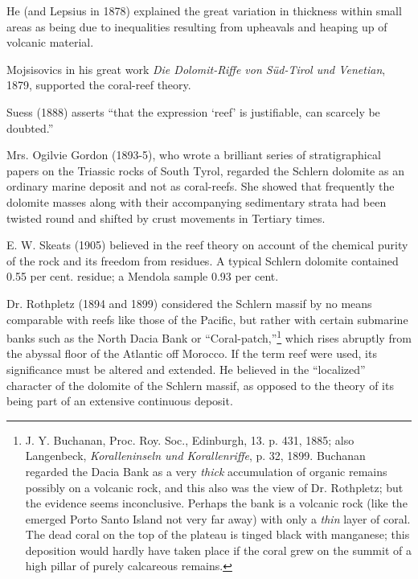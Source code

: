 \documentclass[a4paper, 12pt, oneside]{article}
\begin{document}
He (and Lepsius in 1878) explained the great variation in thickness within small areas as being due to inequalities resulting from upheavals and heaping up of volcanic material.

Mojsisovics in his great work \emph{Die Dolomit-Riffe von Süd-Tirol und Venetian}, 1879, supported the coral-reef theory.

Suess (1888) asserts ``that the expression `reef' is justifiable, can scarcely be doubted.''

Mrs. Ogilvie Gordon (1893-5), who wrote a brilliant series of stratigraphical papers on the Triassic rocks of South Tyrol, regarded the Schlern dolomite as an ordinary marine deposit and not as coral-reefs. She showed that frequently the dolomite masses along with their accompanying sedimentary strata had been twisted round and shifted by crust movements in Tertiary times.

E. W. Skeats (1905) believed in the reef theory on account of the chemical purity of the rock and its freedom from residues. A typical Schlern dolomite contained 0.55 per cent. residue; a Mendola sample 0.93 per cent.

Dr. Rothpletz (1894 and 1899) considered the Schlern massif by no means comparable with reefs like those of the Pacific, but rather with certain submarine banks such as the North Dacia Bank or ``Coral-patch,''\footnote{J. Y. Buchanan, Proc. Roy. Soc., Edinburgh, 13. p. 431, 1885; also Langenbeck, \emph{Koralleninseln und Korallenriffe}, p. 32, 1899. Buchanan regarded the Dacia Bank as a very \emph{thick} accumulation of organic remains possibly on a volcanic rock, and this also was the view of Dr. Rothpletz; but the evidence seems inconclusive. Perhaps the bank is a volcanic rock (like the emerged Porto Santo Island not very far away) with only a \emph{thin} layer of coral. The dead coral on the top of the plateau is tinged black with manganese; this deposition would hardly have taken place if the coral grew on the summit of a high pillar of purely calcareous remains.} which rises abruptly from the abyssal floor of the Atlantic off Morocco. If the term reef were used, its significance must be altered and extended. He believed in the ``localized'' character of the dolomite of the Schlern massif, as opposed to the theory of its being part of an extensive continuous deposit.
\end{document}
